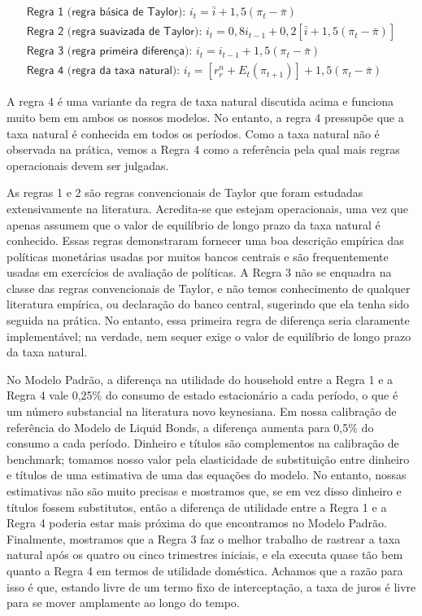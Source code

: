 \begin{align}
    \textsf{Regra 1 (regra básica de Taylor): }  i_t = \bar{i} + 1,5(\pi_t - \bar{\pi})  \\
    \textsf{Regra 2 (regra suavizada de Taylor): } i_t = 0,8i_{t-1} + 0,2[\bar{i} + 1,5(\pi_t - \bar{\pi}) ] \\
    \textsf{Regra 3 (regra primeira diferença): } i_t = i_{t-1} + 1,5(\pi_t - \bar{\pi}) \\
    \textsf{Regra 4 (regra da taxa natural): } i_t = [r_r^{n} + E_t(\pi_{t+1})] + 1,5(\pi_t - \bar{\pi}) 
\end{align}

A regra 4 é uma variante da regra de taxa natural discutida acima e funciona muito bem em ambos os nossos modelos. No entanto, a regra 4 pressupõe que a taxa natural é conhecida em todos os períodos. Como a taxa natural não é observada na prática, vemos a Regra 4 como a referência pela qual mais regras operacionais devem ser julgadas.

As regras 1 e 2 são regras convencionais de Taylor que foram estudadas extensivamente na literatura. Acredita-se que estejam operacionais, uma vez que apenas assumem que o valor de equilíbrio de longo prazo da taxa natural é conhecido. Essas regras demonstraram fornecer uma boa descrição empírica das políticas monetárias usadas por muitos bancos centrais e são frequentemente usadas em exercícios de avaliação de políticas. A Regra 3 não se enquadra na classe das regras convencionais de Taylor, e não temos conhecimento de qualquer literatura empírica, ou declaração do banco central, sugerindo que ela tenha sido seguida na prática. No entanto, essa primeira regra de diferença seria claramente implementável; na verdade, nem sequer exige o valor de equilíbrio de longo prazo da taxa natural.

No Modelo Padrão, a diferença na utilidade do household entre a Regra 1 e a Regra 4 vale 0,25$\%$ do consumo de estado estacionário a cada período, o que é um número substancial na literatura novo keynesiana. Em nossa calibração de referência do Modelo de Liquid Bonds, a diferença aumenta para 0,5$\%$ do consumo a cada período. Dinheiro e títulos são complementos na calibração de benchmark; tomamos nosso valor pela elasticidade de substituição entre dinheiro e títulos de uma estimativa de uma das equações do modelo. No entanto, nossas estimativas não são muito precisas e mostramos que, se em vez disso dinheiro e títulos fossem substitutos, então a diferença de utilidade entre a Regra 1 e a Regra 4 poderia estar mais próxima do que encontramos no Modelo Padrão. Finalmente, mostramos que a Regra 3 faz o melhor trabalho de rastrear a taxa natural após os quatro ou cinco trimestres iniciais, e ela executa quase tão bem quanto a Regra 4 em termos de utilidade doméstica. Achamos que a razão para isso é que, estando livre de um termo fixo de interceptação, a taxa de juros é livre para se mover amplamente ao longo do tempo.

